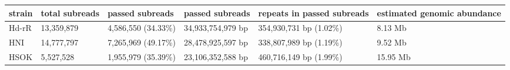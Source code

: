 \begin{tabular}{p{1.5cm}p{2.5cm}p{3cm}p{3cm}p{3.5cm}p{2.5cm}}
  \hline
  strain & total subreads & passed subreads & passed subreads & repeats in passed subreads & estimated genomic abundance \\ \hline
  Hd-rR & 13,359,879 & 4,586,550 (34.33\%) & 34,933,754,979 bp & 354,930,731 bp (1.02\%) &  8.13 Mb \\
  HNI   & 14,777,797 & 7,265,969 (49.17\%) & 28,478,925,597 bp & 338,807,989 bp (1.19\%) &  9.52 Mb \\
  HSOK  &  5,527,528 & 1,955,979 (35.39\%) & 23,106,352,588 bp & 460,716,149 bp (1.99\%) & 15.95 Mb \\
  \hline
\end{tabular}

